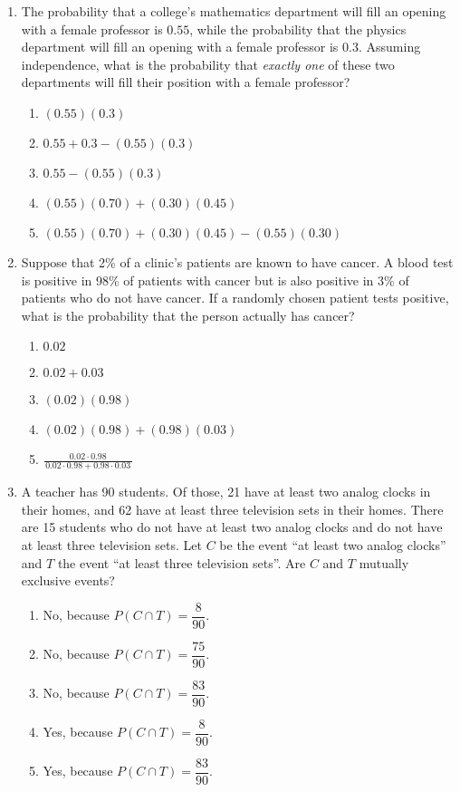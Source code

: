 \documentclass{article}
\begin{document}
\begin{enumerate}[label=\textbf{S\arabic*.}]
\item The probability that a college's mathematics department will fill an opening
with a female professor is $0.55$, while the probability that the physics
department will fill an opening with a female professor is $0.3$.
Assuming independence, what is the probability that \emph{exactly one}
of these two departments will fill their position with a female professor?
\begin{enumerate}
  \item $(0.55)(0.3)$
  \item $0.55+0.3-(0.55)(0.3)$
  \item $0.55-(0.55)(0.3)$
  \item $(0.55)(0.70)+(0.30)(0.45)$
  \item $(0.55)(0.70)+(0.30)(0.45)-(0.55)(0.30)$
\end{enumerate}

\item Suppose that 2\% of a clinic's patients are known to have cancer.
A blood test is positive in 98\% of patients with cancer but is also positive
in 3\% of patients who do not have cancer.
If a randomly chosen patient tests positive, what is the probability
that the person actually has cancer?
\begin{enumerate}
  \item $0.02$
  \item $0.02+0.03$
  \item $(0.02)(0.98)$
  \item $(0.02)(0.98)+(0.98)(0.03)$
  \item $\displaystyle
          \frac{0.02\cdot0.98}{\,0.02\cdot0.98+0.98\cdot0.03\,}$
\end{enumerate}

\item A teacher has 90 students. Of those, 21 have at least two analog clocks
in their homes, and 62 have at least three television sets in their homes.
There are 15 students who do not have at least two analog clocks and do not have
at least three television sets. Let $C$ be the event “at least two analog clocks”
and $T$ the event “at least three television sets”.
Are $C$ and $T$ mutually exclusive events?
\begin{enumerate}
  \item No, because $P(C\cap T)=\dfrac{8}{90}$.
  \item No, because $P(C\cap T)=\dfrac{75}{90}$.
  \item No, because $P(C\cap T)=\dfrac{83}{90}$.
  \item Yes, because $P(C\cap T)=\dfrac{8}{90}$.
  \item Yes, because $P(C\cap T)=\dfrac{83}{90}$.
\end{enumerate}


\end{enumerate}
\end{document}
